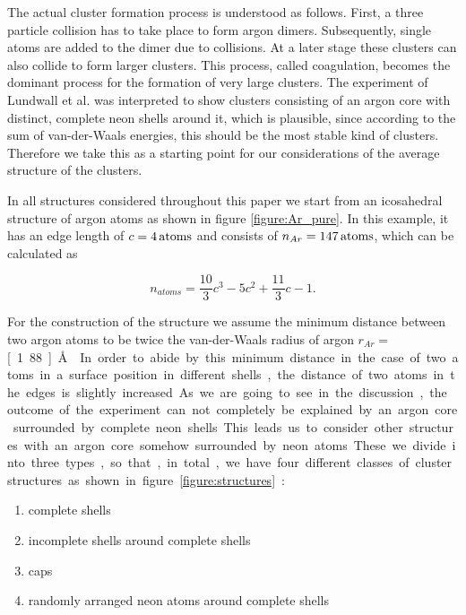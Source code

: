 The actual cluster formation process is understood as follows. First, a three particle
collision has to take place to form argon dimers. Subsequently, single atoms are added to the dimer 
due to collisions. At a later stage these clusters can also collide to form larger clusters. This process,
called coagulation, becomes the dominant process for the formation of very large clusters. 
The experiment of Lundwall et al. \cite{Lundwall07} was interpreted to
show clusters consisting of an argon core with distinct, complete neon
shells around it, which is plausible, since according to the sum of van-der-Waals
energies, this should be the most stable kind of clusters.
Therefore we take this as a starting point for our considerations of the
average structure of the clusters.

In all structures considered throughout this paper we start from an icosahedral
structure of argon atoms as shown in figure \ref{figure:Ar_pure}.
In this example, it has an edge length
of $c=\unit[4]{atoms}$ and consists of $n_{Ar}=\unit[147]{atoms}$, which can be
calculated as \cite{Martin96}

\begin{equation}
  n_{atoms} = \frac{10}{3} c^3 - 5 c^2 + \frac{11}{3} c -1 .
\end{equation}

For the construction of the structure we assume the minimum
distance between two argon
atoms to be twice the van-der-Waals
radius of argon $r_{Ar}=$ \unit[1.88]{\AA} \cite{Bondi64}. In order to abide by this
minimum distance in the case of two atoms in a surface position in different
shells, the distance of two atoms in the edges is slightly increased.

As we are going to see in the discussion, the outcome of the experiment
can not completely be explained by an argon core surrounded by complete neon shells.
This leads us to consider other structures with an argon core somehow surrounded
by neon atoms. These we divide into three types, so that, in total, we have four
different classes of cluster structures as shown in figure \ref{figure:structures}:

\begin{enumerate}
 \item complete shells
 \item incomplete shells around complete shells
 \item caps
 \item randomly arranged neon atoms around complete shells
\end{enumerate}

